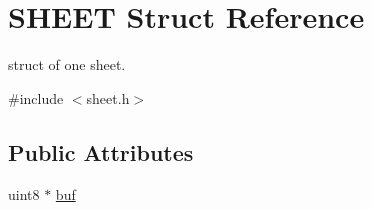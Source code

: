 \hypertarget{struct_s_h_e_e_t}{}\section{S\+H\+E\+E\+T Struct Reference}
\label{struct_s_h_e_e_t}


struct of one sheet.  




{\ttfamily \#include $<$sheet.\+h$>$}

\subsection*{Public Attributes}
\begin{DoxyCompactItemize}
\item 
\hypertarget{struct_s_h_e_e_t_a9da0bb9ee17e8fb8845cee6003a9581a}{}uint8 $\ast$ \hyperlink{struct_s_h_e_e_t_a9da0bb9ee17e8fb8845cee6003a9581a}{buf}\label{struct_s_h_e_e_t_a9da0bb9ee17e8fb8845cee6003a9581a}


\end{DoxyCompactItemize}
